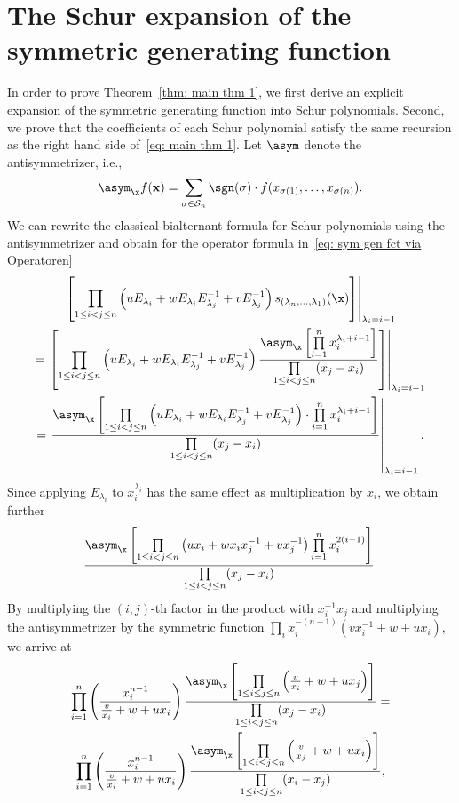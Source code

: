 \section{The Schur expansion of the symmetric generating function}
\label{sec: proof of mt 1}

In order to prove Theorem~\ref{thm: main thm 1}, we first derive an explicit expansion of the symmetric generating function into Schur polynomials. Second, we prove that the coefficients of each Schur polynomial satisfy the same recursion as the right hand side of~\eqref{eq: main thm 1}.
Let $\asym$ denote the antisymmetrizer, i.e.,
\[
\asym_{\x}  f(\mathbf{x}) = \sum\limits_{\sigma \in {\mathcal S}_n} \sgn(\sigma) \allowbreak \cdot f(x_{\sigma(1)},\ldots,x_{\sigma(n)})
.
\] 
We can rewrite the classical bialternant formula for Schur polynomials using the antisymmetrizer and obtain for the operator formula in~\eqref{eq: sym gen fct via Operatoren}
\begin{multline*}
 \left. \left[ \prod_{1 \leq i < j \leq n} \left(u E_{\lambda_i}  + w E_{\lambda_i}E_{\lambda_j}^{-1} +  v E_{\lambda_j}^{-1}  \right) s_{(\lambda_n,\ldots,\lambda_1)}(\x) \right] \right|_{\lambda_i=i-1} \\
=  \left. \left[ \prod_{1 \leq i < j \leq n} \left(u E_{\lambda_i}  + w E_{\lambda_i}E_{\lambda_j}^{-1} +  v E_{\lambda_j}^{-1}  \right) \frac{\asym_\x \left[\prod\limits_{i=1}^n x_i^{\lambda_i+i-1}\right]}{\prod\limits_{1 \leq i < j \leq n}(x_j-x_i)} \right] \right|_{\lambda_i=i-1} \\
=  \left.  \frac{\asym_\x \left[\prod\limits_{1 \leq i < j \leq n} \left(u E_{\lambda_i}  + w E_{\lambda_i}E_{\lambda_j}^{-1} +  v E_{\lambda_j}^{-1}  \right) \cdot \prod\limits_{i=1}^n x_i^{\lambda_i+i-1}\right]}{\prod\limits_{1 \leq i < j \leq n}(x_j-x_i)} \right|_{\lambda_i=i-1}.
\end{multline*}
Since applying $E_{\lambda_i}$ to  $x_i^{\lambda_i}$ has the same effect as multiplication by $x_i$, we obtain further
\begin{equation}  \frac{\asym_\x \left[
\prod\limits_{1 \leq i < j \leq n} \left(u x_i  + w x_i x_j^{-1} +  v x_j^{-1}  \right) \prod\limits_{i=1}^n x_i^{2(i-1)} \right]}{\prod\limits_{1 \leq i < j \leq n}(x_j-x_i)}. \label{eq: sym gen fct via antisym}
\end{equation} 
 By multiplying the $(i,j)$-th factor in the product with $x_i^{-1} x_j$ and multiplying the antisymmetrizer by the symmetric function $\prod_i x_i^{-(n-1)}(v x_i^{-1}+w+ux_i)$,
  we arrive at
\begin{multline*}
\prod\limits_{i=1}^n \left( \frac{ x_i^{n-1}}{\frac{ v}{x_i} + w + u x_i} \right)
   \frac{ \asym_{\x} 
\left[  \prod\limits_{1 \le i \le  j \le n} \left(\frac{ v}{x_i} + w + u x_j\right) \right]}{ \prod\limits_{1 \le i < j \le n} (x_j - x_i)}
=\\
\prod\limits_{i=1}^n \left( \frac{ x_i^{n-1}}{\frac{ v}{x_i} + w + u x_i} \right)
   \frac{ \asym_{\x} 
\left[  \prod\limits_{1 \le i \le  j \le n} \left(\frac{ v}{x_j} + w + u x_i\right) \right]}{ \prod\limits_{1 \le i < j \le n} (x_i - x_j)},
\end{multline*}
